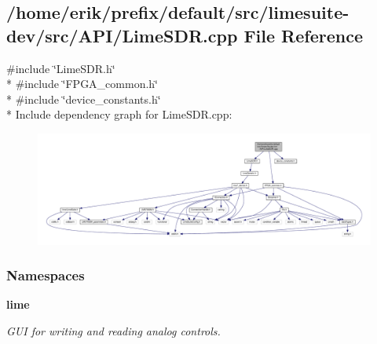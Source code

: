 \subsection{/home/erik/prefix/default/src/limesuite-\/dev/src/\+A\+P\+I/\+Lime\+S\+DR.cpp File Reference}
\label{LimeSDR_8cpp}
{\ttfamily \#include \char`\"{}Lime\+S\+D\+R.\+h\char`\"{}}\\*
{\ttfamily \#include \char`\"{}F\+P\+G\+A\+\_\+common.\+h\char`\"{}}\\*
{\ttfamily \#include \char`\"{}device\+\_\+constants.\+h\char`\"{}}\\*
Include dependency graph for Lime\+S\+D\+R.\+cpp\+:
\nopagebreak
\begin{figure}[H]
\begin{center}
\leavevmode
\includegraphics[width=350pt]{d0/ddc/LimeSDR_8cpp__incl}
\end{center}
\end{figure}
\subsubsection*{Namespaces}
\begin{DoxyCompactItemize}
\item 
 {\bf lime}
\begin{DoxyCompactList}\small\item\em G\+UI for writing and reading analog controls. \end{DoxyCompactList}\end{DoxyCompactItemize}

